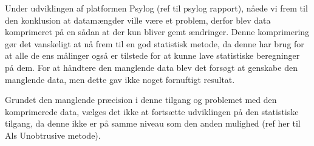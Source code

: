 Under udviklingen af platformen Psylog (ref til psylog rapport), nåede vi frem til den konklusion at datamængder ville være et problem, derfor blev data komprimeret på en sådan at der kun bliver gemt ændringer.
Denne komprimering gør det vanskeligt at nå frem til en god statistisk metode, da denne har brug for at alle de ens målinger også er tilstede for at kunne lave statistiske beregninger på dem.
For at håndtere den manglende data blev det forsøgt at genskabe den manglende data, men dette gav ikke noget fornuftigt resultat.

Grundet den manglende præcision i denne tilgang og problemet med den komprimerede data, vælges det ikke at fortsætte udviklingen på den statistiske tilgang, da denne ikke er på samme niveau som den anden mulighed (ref her til Als Unobtrusive metode).
